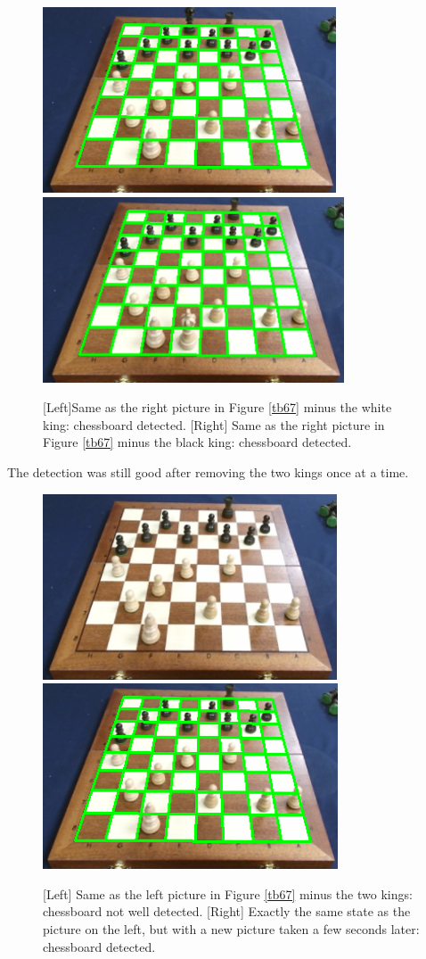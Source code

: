 \documentclass{l4proj}
\begin{document}
\begin{figure}[h!]
\includegraphics[scale=0.75]{1tb8.png} \includegraphics[scale=0.75]{1tb9.png}
\caption{[Left]Same as the right picture in Figure \ref{tb67} minus the white king: chessboard detected. [Right] Same as the right picture in Figure \ref{tb67} minus the black king: chessboard detected.}
\label{tb89}
\end{figure}

The detection was still good after removing the two kings once at a time.


\begin{figure}[h!]
\includegraphics[scale=0.75]{tb10.png} \includegraphics[scale=0.75]{1tb11.png}
\caption{[Left] Same as the left picture in Figure \ref{tb67} minus the two kings: chessboard not well detected. [Right] Exactly the same state as the picture on the left, but with a new picture taken a few seconds later: chessboard detected.}
\label{tb1011}
\end{figure}
\end{document}
